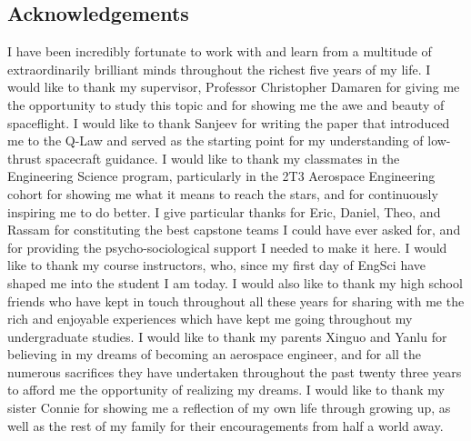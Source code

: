 \vspace*{\fill}

\newpage
\vspace*{\fill}
\begin{center}
  \section*{Acknowledgements}
\end{center}
I have been incredibly fortunate to work with and learn from a multitude of extraordinarily brilliant minds throughout the richest five years of my life. I would like to thank my supervisor, Professor Christopher Damaren for giving me the opportunity to study this topic and for showing me the awe and beauty of spaceflight. I would like to thank Sanjeev for writing the paper that introduced me to the Q-Law and served as the starting point for my understanding of low-thrust spacecraft guidance. I would like to thank my classmates in the Engineering Science program, particularly in the 2T3 Aerospace Engineering cohort for showing me what it means to reach the stars, and for continuously inspiring me to do better. I give particular thanks for Eric, Daniel, Theo, and Rassam for constituting the best capstone teams I could have ever asked for, and for providing the psycho-sociological support I needed to make it here. I would like to thank my course instructors, who, since my first day of EngSci have shaped me into the student I am today. I would also like to thank my high school friends who have kept in touch throughout all these years for sharing with me the rich and enjoyable experiences which have kept me going throughout my undergraduate studies. I would like to thank my parents Xinguo and Yanlu for believing in my dreams of becoming an aerospace engineer, and for all the numerous sacrifices they have undertaken throughout the past twenty three years to afford me the opportunity of realizing my dreams. I would like to thank my sister Connie for showing me a reflection of my own life through growing up, as well as the rest of my family for their encouragements from half a world away.
\vspace*{\fill}


\tableofcontents
\listoffigures
\listoftables